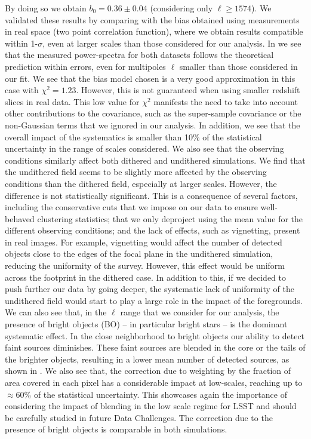 \documentclass[twocolumn]{aastex62}
\begin{document}
By doing so we obtain $b_{0} = 0.36 \pm 0.04$ (considering only $\ell \geq 1574$). We validated these results by comparing with the bias obtained using measurements in real space (two point correlation function), where we obtain results compatible within 1-$\sigma$, even at larger scales than those considered for our analysis. In  we see that the measured power-spectra for both datasets follows the theoretical prediction within errors, even for multipoles $\ell$ smaller than those considered in our fit. We see that the bias model chosen is a very good approximation in this case with $\chi^{2}=1.23$. However, this is not guaranteed when using smaller redshift slices in real data. This low value for $\chi^{2}$ manifests the need to take into account other contributions to the covariance, such as the super-sample covariance or the non-Gaussian terms that we ignored in our analysis. In addition, we see that the overall impact of the systematics is smaller than 10\% of the statistical uncertainty in the range of scales considered. We also see that the observing conditions similarly affect both dithered and undithered simulations. We find that the undithered field seems to be slightly more affected by the observing conditions than the dithered field, especially at larger scales. However, the difference is not statistically significant. This is a consequence of several factors, including the conservative cuts that we impose on our data to ensure well-behaved clustering statistics; that we only deproject using the mean value for the different observing conditions; and the lack of effects, such as vignetting, present in real images. For example, vignetting would affect the number of detected objects close to the edges of the focal plane in the undithered simulation, reducing the uniformity of the survey. However, this effect would be uniform across the footprint in the dithered case. In addition to this, if we decided to push further our data by going deeper, the systematic lack of uniformity of the undithered field would start to play a large role in the impact of the foregrounds. We can also see that, in the $\ell$ range that we consider for our analysis, the presence of bright objects (BO) -- in particular bright stars -- is the dominant systematic effect. In the close neighborhood to bright objects our ability to detect faint sources diminishes. These faint sources are blended in the core or the tails of the brighter objects, resulting in a lower mean number of detected sources, as shown in . We also see that, the correction due to weighting by the fraction of area covered in each pixel has a considerable impact at low-scales, reaching up to $\approx 60\%$ of the statistical uncertainty. This showcases again the importance of considering the impact of blending in the low scale regime for LSST and should be carefully studied in future Data Challenges. The correction due to the presence of bright objects is comparable in both simulations.
\end{document}
